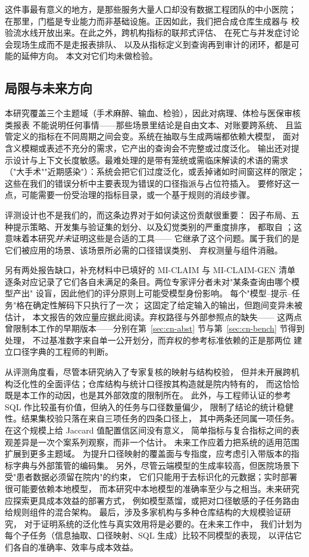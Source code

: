 \documentclass[11pt,a4paper]{article}
\begin{document}
这件事最有意义的地方，是那些服务大量人口却没有数据工程团队的中小医院；
在那里，门槛是专业能力而非基础设施。正因如此，我们把合成仓库生成器与
校验流水线开放出来。在此之外，跨机构指标的联邦式评估、
在死亡与并发症讨论会现场生成而不是走报表排队、
以及从指标定义到查询再到审计的闭环，都是可能的延伸方向。
本文对它们均未做检验。

\subsection{局限与未来方向}
本研究覆盖三个主题域（手术麻醉、输血、检验），因此对病理、体检与医保审核类报表
不能说明任何事情——那些场景里结论是自由文本、对账要跨系统、
且监管定义的指标在不同周期之间会变。系统在抽取与生成两端都依赖大模型，
面对含义模糊或表述不充分的需求，它产出的查询会不完整或过度泛化。
输出还对提示设计与上下文长度敏感。最难处理的是带有笼统或需临床解读的术语的需求
（"大手术""近期感染"）：系统会把它们过度泛化，或丢掉诸如时间窗这样的限定；
这些在我们的错误分析中主要表现为错误的口径指派与占位符插入。
要修好这一点，可能需要一份受治理的指标目录，或一个基于规则的消歧步骤。

评测设计也不是我们的，而这条边界对于如何读这份贡献很重要：
因子布局、五种提示策略、开发集与验证集的划分、以及幻觉类别的严重度排序，
都取自 \cite{lee2025}；这意味着本研究\emph{并未}证明这些是合适的工具——
它继承了这个问题。属于我们的是它们被应用的场景、该场景所必需的口径错误类别、
弃权测量与组件消融。

另有两处报告缺口，补充材料中已填好的 MI-CLAIM 与 MI-CLAIM-GEN 清单
逐条对应记录了它们各自未满足的条目。两位专家评分者未对"某条查询由哪个模型产出"
设盲，因此他们的评分原则上可能受模型身份影响。
每个"模型--提示--任务"格在确定性解码下只执行了一次；
这固定了给定输入的输出，但跑间变异未被估计，
本文报告的效应量应据此阅读。弃权路径与外部参照点的缺失——
这两点曾限制本工作的早期版本——分别在第~\ref{sec:cn-abst} 节与第~\ref{sec:cn-bench} 节得到处理，
不过基准数字来自单一公开划分，而弃权的参考标准依赖的正是那两位
建立口径字典的工程师的判断。

从评测角度看，尽管本研究纳入了专家复核的映射与结构校验，
但并未开展跨机构泛化性的全面评估；仓库结构与统计口径按其构造就是院内特有的，
而这恰恰既是本工作的动因，也是其外部效度的限制所在。
此外，与工程师认证的参考 SQL 作比较虽有价值，但纳入的任务与口径数量偏少，
限制了结论的统计稳健性。结果集校验只落在来自三项任务的四条口径上，
其中两条还同属一项任务。在这个规模上给 Jaccard 值配置信区间没有意义，
简单指标与复合指标之间的表观差异是一次个案系列观察，而非一个估计。
未来工作应着力把系统的适用范围扩展到更多主题域。
为提升口径映射的覆盖面与专指度，应考虑引入带版本的指标字典与外部策管的编码集。
另外，尽管云端模型的生成率较高，但医院场景下受"患者数据必须留在院内"的约束，
它们只能用于去标识化的元数据；实时部署很可能要依赖本地模型，
而本研究中本地模型的准确率至少与之相当。未来研究应探索更具成本效益的部署方式，
例如模型蒸馏，或把对口径敏感的子任务路由给规则组件的混合架构。
最后，涉及多家机构与多种仓库结构的大规模验证研究，
对于证明系统的泛化性与真实效用将是必要的。在未来工作中，
我们计划为每个子任务（信息抽取、口径映射、SQL 生成）比较不同模型的表现，
以评估它们各自的准确率、效率与成本效益。
\end{document}
